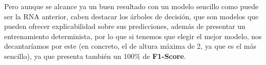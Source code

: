 \documentclass[12pt]{article}
\begin{document}
\begin{table}[!ht]
	\centering
	
	\caption{Matriz de confusión RNA}
    \label{tab:confusion_matrix_1}
\end{table}

\newpage
Pero aunque se alcance ya un buen resultado con un modelo sencillo como puede ser la RNA anterior, caben destacar los árboles de decisión,
que son modelos que pueden ofrecer explicabilidad sobre sus predicciones, además de presentar un entrenamiento determinista, por lo que 
si tenemos que elegir el mejor modelo, nos decantaríamos por este (en concreto, el de altura máxima de 2, ya que es el más sencillo), 
ya que presenta también un 100\% de \textbf{F1-Score}.
\end{document}
